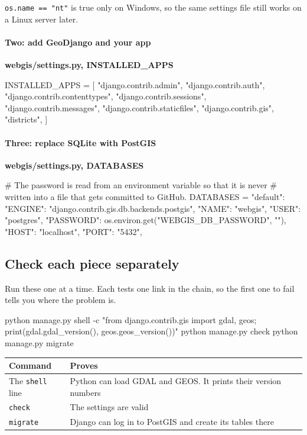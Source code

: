 \documentclass{article}
\newcommand{\cd}[1]{\texttt{#1}}
\newcommand{\codecap}[1]{%
  \par\vspace{.9em}\noindent\textbf{#1}\par\vspace{-.6em}}
\begin{document}
\cd{os.name == "nt"} is true only on Windows, so the same settings file
still works on a Linux server later.

\paragraph{Two: add GeoDjango and your app}

\codecap{webgis/settings.py, INSTALLED\_APPS}
\begin{code}
INSTALLED_APPS = [
    "django.contrib.admin",
    "django.contrib.auth",
    "django.contrib.contenttypes",
    "django.contrib.sessions",
    "django.contrib.messages",
    "django.contrib.staticfiles",
    "django.contrib.gis",
    "districts",
]
\end{code}

\paragraph{Three: replace SQLite with PostGIS}

\codecap{webgis/settings.py, DATABASES}
\begin{code}
# The password is read from an environment variable so that it is never
# written into a file that gets committed to GitHub.
DATABASES = {
    "default": {
        "ENGINE": "django.contrib.gis.db.backends.postgis",
        "NAME": "webgis",
        "USER": "postgres",
        "PASSWORD": os.environ.get("WEBGIS_DB_PASSWORD", ""),
        "HOST": "localhost",
        "PORT": "5432",
    }
}
\end{code}

\subsection{Check each piece separately}

Run these one at a time. Each tests one link in the chain, so the first
one to fail tells you where the problem is.

\begin{code}
python manage.py shell -c "from django.contrib.gis import gdal, geos; print(gdal.gdal_version(), geos.geos_version())"
python manage.py check
python manage.py migrate
\end{code}

\begin{tabularx}{\textwidth}{@{}L{3.2cm} X@{}}
\toprule
\textbf{Command} & \textbf{Proves} \\
\midrule
The \cd{shell} line & Python can load GDAL and GEOS. It prints their
                      version numbers \\
\cd{check}          & The settings are valid \\
\cd{migrate}        & Django can log in to PostGIS and create its tables
                      there \\
\bottomrule
\end{tabularx}
\end{document}
